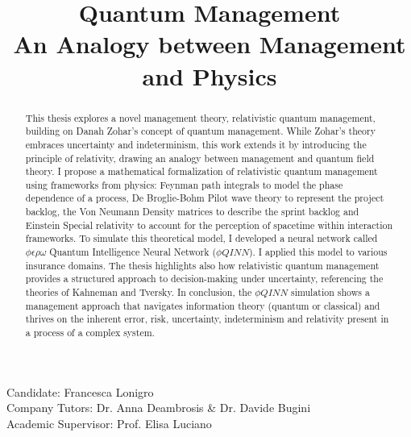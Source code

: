 \documentclass{article}
\title{Quantum Management\\An Analogy between Management and Physics}
\author{}
\date{}
\begin{document}
\begin{description}
    \item[Candidate: Francesca Lonigro]
    \item[Company Tutors: Dr. Anna Deambrosis \& Dr. Davide Bugini]
    \item[Academic Supervisor: Prof. Elisa Luciano]
\end{description}
\subsubsection*{}
\begin{abstract}
    This thesis explores a novel management theory, relativistic quantum management, building on Danah Zohar's concept of quantum management. While Zohar's theory embraces uncertainty and indeterminism, this work extends it by introducing the principle of relativity, drawing an analogy between management and quantum field theory. I propose a mathematical formalization of relativistic quantum management using frameworks from physics: Feynman path integrals to model the phase dependence of a process, De Broglie-Bohm Pilot wave theory to represent the project backlog, the Von Neumann Density matrices to describe the sprint backlog and Einstein Special relativity to account for the perception of spacetime within interaction frameworks. To simulate this theoretical model, I developed a neural network called $\phi \epsilon \rho \omega$ Quantum Intelligence Neural Network ($\phi QINN$). I applied this model to various insurance domains. The thesis highlights also how relativistic quantum management provides a structured approach to decision-making under uncertainty, referencing the theories of Kahneman and Tversky. In conclusion, the $\phi QINN$ simulation shows a management approach that navigates information theory (quantum or classical) and thrives on the inherent error, risk, uncertainty, indeterminism and relativity present in a process of a complex system.
\end{abstract}
\end{document}
